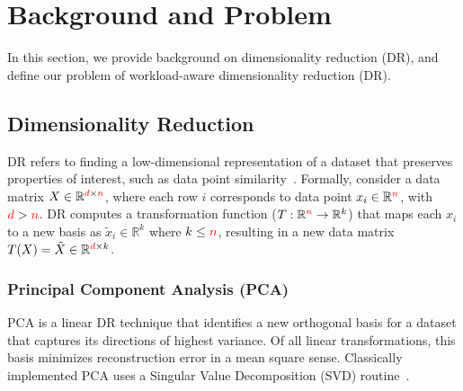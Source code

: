 \section{Background and Problem}
\label{sec:background}

In this section, we  provide background on dimensionality reduction (DR), and define our problem of workload-aware dimensionality reduction (DR). 

\subsection{Dimensionality Reduction}
\label{sec:defs}

DR refers to finding a low-dimensional representation of a dataset that preserves properties of interest, such as data point similarity~\cite{dr-survey1,dr-survey2}. Formally, consider a data matrix $X \in \mathbb{R}^{{\color{red}d} \times {\color{red}n}}$, where each row $i$ corresponds to data point $x_i \in \mathbb{R}^{\color{red}n}$, with ${\color{red}d} > {\color{red}n}$.  
DR computes a transformation function ($T: \mathbb{R}^{\color{red}n} \rightarrow \mathbb{R}^k$) that maps each $x_i$ to a new basis as $\tilde{x}_i \in \mathbb{R}^k$ where $k \leq {\color{red}n}$, resulting in a new data matrix $T(X) = \tilde{X} \in \mathbb{R}^{{\color{red}d} \times k}$.

\subsubsection*{Principal Component Analysis (PCA)}
\label{sec:pca}
PCA is a linear DR technique that identifies a new orthogonal basis for a dataset that captures its directions of highest variance.
Of all linear transformations, this basis minimizes reconstruction error in a mean square sense. 
Classically implemented PCA uses a Singular Value Decomposition (SVD) routine~\cite{trefethen}.

